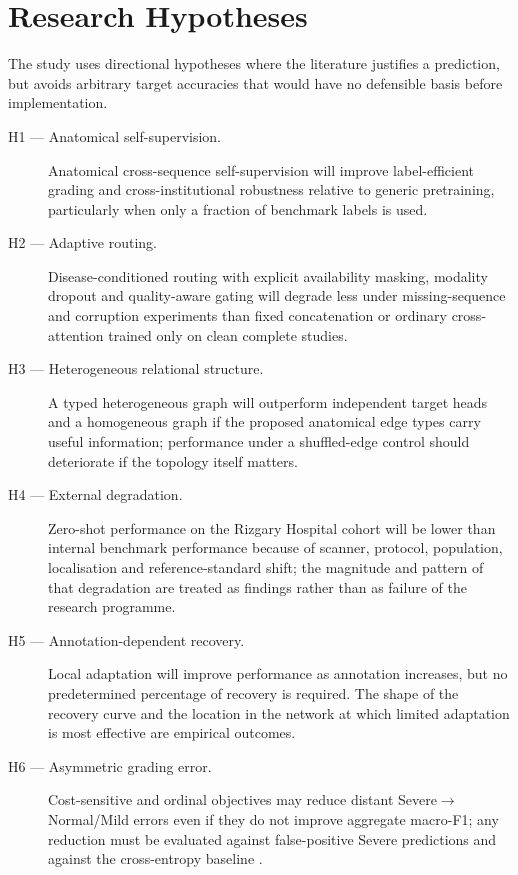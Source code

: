 \section{Research Hypotheses}
\label{sec:intro-hypotheses}

The study uses directional hypotheses where the literature justifies a prediction,
but avoids arbitrary target accuracies that would have no defensible basis before
implementation.

\begin{description}
  \item[H1 --- Anatomical self-supervision.] Anatomical cross-sequence
  self-supervision will improve label-efficient grading and cross-institutional
  robustness relative to generic pretraining, particularly when only a fraction of
  benchmark labels is used.

  \item[H2 --- Adaptive routing.] Disease-conditioned routing with explicit
  availability masking, modality dropout and quality-aware gating will degrade less
  under missing-sequence and corruption experiments than fixed concatenation or
  ordinary cross-attention trained only on clean complete studies.

  \item[H3 --- Heterogeneous relational structure.] A typed heterogeneous graph
  will outperform independent target heads and a homogeneous graph if the proposed
  anatomical edge types carry useful information; performance under a shuffled-edge
  control should deteriorate if the topology itself matters.

  \item[H4 --- External degradation.] Zero-shot performance on the Rizgary Hospital
  cohort will be lower than internal benchmark performance because of scanner,
  protocol, population, localisation and reference-standard shift; the magnitude
  and pattern of that degradation are treated as findings rather than as failure of
  the research programme.

  \item[H5 --- Annotation-dependent recovery.] Local adaptation will improve
  performance as annotation increases, but no predetermined percentage of recovery
  is required. The shape of the recovery curve and the location in the network at
  which limited adaptation is most effective are empirical outcomes.

  \item[H6 --- Asymmetric grading error.] Cost-sensitive and ordinal objectives may
  reduce distant Severe$\rightarrow$Normal/Mild errors even if they do not improve
  aggregate macro-F1; any reduction must be evaluated against false-positive Severe
  predictions and against the cross-entropy baseline
  \cite{niemeyer2021a}.
\end{description}

